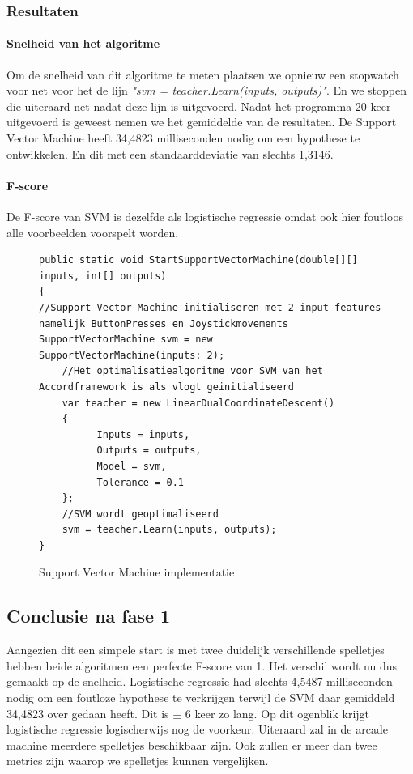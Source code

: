 \subsubsection{Resultaten}
\paragraph{Snelheid van het algoritme} 
Om de snelheid van dit algoritme te meten plaatsen we opnieuw een stopwatch voor net voor het de lijn \textit{"svm = teacher.Learn(inputs, outputs)"}. En we stoppen die uiteraard net nadat deze lijn is uitgevoerd. Nadat het programma 20 keer uitgevoerd is geweest nemen we het gemiddelde van de resultaten. De Support Vector Machine heeft 34,4823 milliseconden nodig om een hypothese te ontwikkelen. En dit met een standaarddeviatie van slechts 1,3146.

\paragraph{F-score}
De F-score van SVM is dezelfde als logistische regressie omdat ook hier foutloos alle voorbeelden voorspelt worden.


\begin{figure}[]
\renewcommand{\figurename}{Code}
\begin{lstlisting}
public static void StartSupportVectorMachine(double[][] inputs, int[] outputs)
{
//Support Vector Machine initialiseren met 2 input features namelijk ButtonPresses en Joystickmovements
SupportVectorMachine svm = new 			SupportVectorMachine(inputs: 2);
	//Het optimalisatiealgoritme voor SVM van het Accordframework is als vlogt geinitialiseerd
	var teacher = new LinearDualCoordinateDescent()
	{
	      Inputs = inputs,
	      Outputs = outputs,
	      Model = svm,
	      Tolerance = 0.1
	};
	//SVM wordt geoptimaliseerd
	svm = teacher.Learn(inputs, outputs);
}
\end{lstlisting}
\caption{Support Vector Machine implementatie}
\label{code:svmBi}
\end{figure}
\subsection{Conclusie na fase 1}
Aangezien dit een simpele start is met twee duidelijk verschillende spelletjes hebben beide algoritmen een perfecte F-score van 1.  Het verschil wordt nu dus gemaakt op de snelheid. Logistische regressie had slechts 4,5487 milliseconden nodig om een foutloze hypothese te verkrijgen terwijl de SVM daar gemiddeld 34,4823 over gedaan heeft. Dit is $\pm$ 6 keer zo lang. 
\newline
Op dit ogenblik krijgt logistische regressie logischerwijs nog de voorkeur. Uiteraard zal in de arcade machine meerdere spelletjes beschikbaar zijn. Ook zullen er meer dan twee metrics zijn waarop we spelletjes kunnen vergelijken. 








